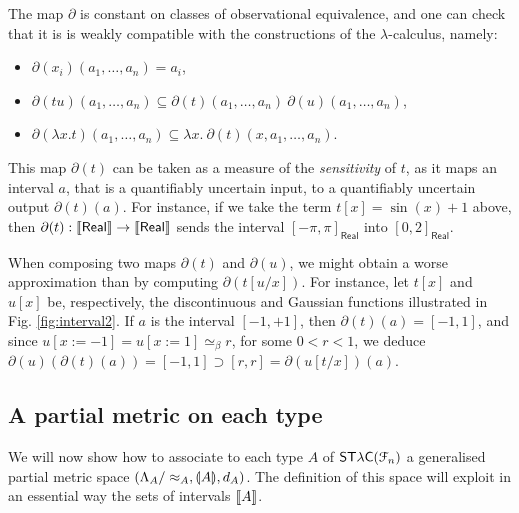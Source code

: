 \begin{remark} \label{remark:push-exp-stlc}
The map $\partial$ is constant on classes of observational equivalence, and one can check that it is is weakly compatible with the constructions of the $\lambda$-calculus, namely:
\begin{itemize}
\item $\partial (x_{i})(a_{1},\dots, a_{n})=a_{i}$,
\item $\partial (tu)(a_{1},\dots, a_{n}) \subseteq \partial (t)(a_{1},\dots, a_{n}) ~ \partial (u)(a_{1},\dots, a_{n})$,
\item $\partial (\lambda x. t)(a_{1},\dots, a_{n}) \subseteq \lambda x.~ \partial (t)(x, a_{1},\dots, a_{n})$.
\end{itemize}
\end{remark}

This map $\partial(t)$ can be taken as a measure of the \emph{sensitivity} of $t$, as it maps an interval $a$, that is a quantifiably uncertain input, to a quantifiably uncertain output $\partial(t)(a)$. 
For instance, if we take the term $t[x]= \sin(x)+1$ above, then $\partial(t): \llbracket \mathsf{Real} \rrbracket\to \llbracket \mathsf{Real} \rrbracket$ sends the interval $[-\pi,\pi]_{\mathsf{Real}}$ into $[0,2]_{\mathsf{Real}}$.

\begin{remark} \label{remark:oplax-functor-stlc}
When composing two maps $\partial(t)$ and $\partial(u)$, we might obtain a worse approximation than by computing $\partial(t[u/x])$.
For instance, let $t[x]$ and 
$u[x]$ be, respectively, the discontinuous and Gaussian functions illustrated in Fig. \ref{fig:interval2}.  
If $a$ is the interval $[-1,+1]$, then $\partial(t)(a)=[-1,1]$, and since $u[x:=-1]=u[x:=1]\simeq_{\beta} r$, for some $0<r<1$, we deduce $\partial(u)(\partial(t)(a))=[-1,1] \supset [r,r  ]= \partial (u[t/x])(a)$.

\end{remark}










\subsection{A partial metric on each type}
\label{subsection:type-gpms}

We will now show how to associate to each type $A$ of $\mathsf{ST\lambda C}(\mathcal F_{n})$ a generalised partial metric space $(\Lambda_{A}/\approx_{A}, \llparenthesis A \rrparenthesis, d_{A})$. The definition of this space will exploit in an essential way the sets of intervals $\llbracket A \rrbracket$.


